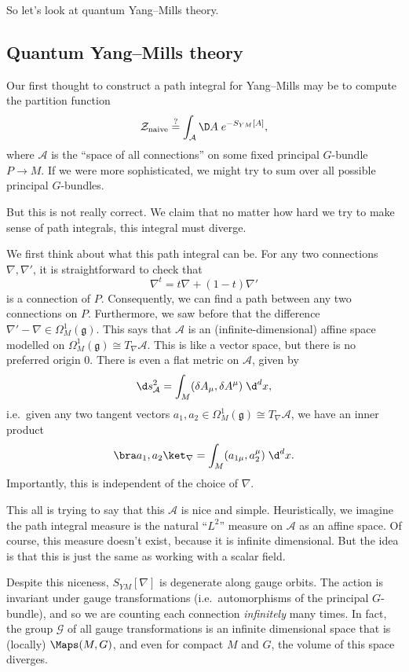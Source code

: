 \documentclass[a4paper]{article}
\begin{document}
So let's look at quantum Yang--Mills theory.
\subsection{Quantum Yang--Mills theory}
Our first thought to construct a path integral for Yang--Mills may be to compute the partition function
\[
  \mathcal{Z}_{\mathrm{naive}} \overset{?}{=} \int_\mathcal{A} \D A\; e^{-S_{YM}[A]},
\]
where $\mathcal{A}$ is the ``space of all connections'' on some fixed principal $G$-bundle $P \to M$. If we were more sophisticated, we might try to sum over all possible principal $G$-bundles.

But this is not really correct. We claim that no matter how hard we try to make sense of path integrals, this integral must diverge.

We first think about what this path integral can be. For any two connections $\nabla, \nabla'$, it is straightforward to check that
\[
  \nabla^t = t \nabla + (1 - t) \nabla'
\]
is a connection of $P$. Consequently, we can find a path between any two connections on $P$. Furthermore, we saw before that the difference $\nabla' - \nabla \in \Omega_M^1 (\mathfrak{g})$. This says that $\mathcal{A}$ is an (infinite-dimensional) affine space modelled on $\Omega^1_M(\mathfrak{g}) \cong T_\nabla \mathcal{A}$. This is like a vector space, but there is no preferred origin $0$. There is even a flat metric on $\mathcal{A}$, given by
\[
  \d s^2 _\mathcal{A} = \int_M (\delta A_\mu, \delta A^\mu)\;\d^d x,
\]
i.e.\ given any two tangent vectors $a_1, a_2 \in \Omega_M^1(\mathfrak{g}) \cong T_\nabla \mathcal{A}$, we have an inner product
\[
  \bra a_1, a_2 \ket_\nabla = \int_M (a_{1 \mu}, a^{\mu}_2) \;\d^d x.
\]
Importantly, this is independent of the choice of $\nabla$.

This all is trying to say that this $\mathcal{A}$ is nice and simple. Heuristically, we imagine the path integral measure is the natural ``$L^2$'' measure on $\mathcal{A}$ as an affine space. Of course, this measure doesn't exist, because it is infinite dimensional. But the idea is that this is just the same as working with a scalar field.

Despite this niceness, $S_{YM}[\nabla]$ is degenerate along gauge orbits. The action is invariant under gauge transformations (i.e.\ automorphisms of the principal $G$-bundle), and so we are counting each connection \emph{infinitely} many times. In fact, the group $\mathcal{G}$ of all gauge transformations is an infinite dimensional space that is (locally) $\Maps(M, G)$, and even for compact $M$ and $G$, the volume of this space diverges.
\end{document}
